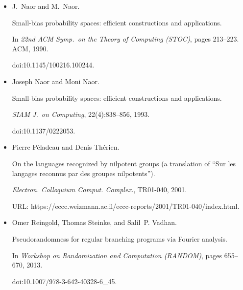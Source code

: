 \begin{itemize}
In \emph{Approximation, randomization, and combinatorial
optimization}, volume 5687 of \emph{Lecture Notes in Comput. Sci.}, pages
658–672. Springer, Berlin, 2009.


doi:10.1007/978-3-642-03685-9\_49.





\item[] 
[40]

J. Naor and M. Naor.


Small-bias probability spaces: efficient constructions and
applications.


In \emph{22nd ACM Symp. on the Theory of Computing (STOC)}, pages
213–223. ACM, 1990.


doi:10.1145/100216.100244.





\item[] 
[41]

Joseph Naor and Moni Naor.


Small-bias probability spaces: efficient constructions and
applications.


\emph{SIAM J. on Computing}, 22(4):838–856, 1993.


doi:10.1137/0222053.





\item[] 
[42]

Pierre Péladeau and Denis Thérien.


On the languages recognized by nilpotent groups (a translation of
“Sur les langages reconnus par des groupes nilpotents”).


\emph{Electron. Colloquium Comput. Complex.}, TR01-040, 2001.


URL:
https://eccc.weizmann.ac.il/eccc-reports/2001/TR01-040/index.html.





\item[] 
[43]

Omer Reingold, Thomas Steinke, and Salil P. Vadhan.


Pseudorandomness for regular branching programs via Fourier
analysis.


In \emph{Workshop on Randomization and Computation (RANDOM)}, pages
655–670, 2013.


doi:10.1007/978-3-642-40328-6\_45.






\end{itemize}
